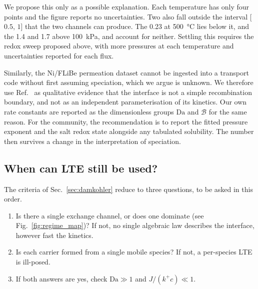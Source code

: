 \documentclass[5p]{elsarticle}
\newcommand{\Da}{\mathrm{Da}}
\newcommand{\Bra}{\mathcal{B}}             %
\begin{document}
We propose this only as a possible explanation.
Each temperature has only four points and the figure reports no uncertainties.
Two also fall outside the interval [$0.5$, $1$] that the two channels can produce.
The \num{0.23} at \qty{500}{\celsius} lies below it, and the \num{1.4} and \num{1.7} above \qty{100}{\kilo\pascal}, and account for neither.
Settling this requires the redox sweep proposed above, with more pressures at each temperature and uncertainties reported for each flux.

Similarly, the Ni/FLiBe permeation dataset cannot be ingested into a transport code without first assuming speciation, which we argue is unknown.
We therefore use Ref.~\cite{calderoni_measurement_2008} as qualitative evidence that the interface is not a simple recombination boundary, and not as an independent parameterisation of its kinetics.
Our own rate constants are reported as the dimensionless groups $\Da$ and $\Bra$ for the same reason.
For the community, the recommendation is to report the fitted pressure exponent and the salt redox state alongside any tabulated solubility.
The number then survives a change in the interpretation of speciation.

\subsection{When can LTE still be used?}
\label{sec:when_lte}

The criteria of Sec.~\ref{sec:damkohler} reduce to three questions, to be asked in this order.

\begin{enumerate}
    \item Is there a single exchange channel, or does one dominate (see Fig.~\ref{fig:regime_map})? If not, no single algebraic law describes the interface, however fast the kinetics.
    \item Is each carrier formed from a single mobile species? If not, a per-species LTE is ill-posed.
    \item If both answers are yes, check $\Da \gg 1$ and $J/(k^{+}c) \ll 1$.
\end{enumerate}

\end{document}
